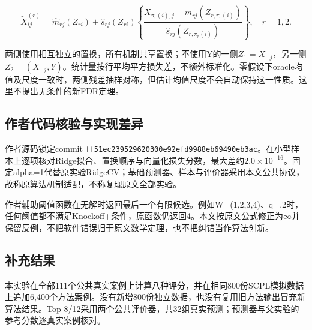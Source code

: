 \documentclass[UTF8,11pt,a4paper]{ctexart}
\begin{document}
\[
\widetilde X^{(r)}_{ij}
=\widehat m_{rj}(Z_{ri})+
\widehat s_{rj}(Z_{ri})
\left\{\frac{X_{\pi_r(i),j}-\widehat m_{rj}(Z_{r,\pi_r(i)})}
{\widehat s_{rj}(Z_{r,\pi_r(i)})}\right\},\quad r=1,2.
\]

两侧使用相互独立的置换，所有机制共享置换；不使用Y的一侧\(Z_1=X_{-j}\)，另一侧\(Z_2=(X_{-j},Y)\)。统计量按行平均平方损失差，不额外标准化。零假设下oracle均值及尺度一致时，两侧残差抽样对称，但估计均值尺度不会自动保持这一性质。这里不提出无条件的新FDR定理。

\subsection{作者代码核验与实现差异}

作者源码锁定commit \texttt{ff51ec239529620300e92efd9988eb69490eb3ac}。在小型样本上逐项核对Ridge拟合、置换顺序与向量化损失分数，最大差约\(2.0\times10^{-16}\)。固定alpha=1代替原实验RidgeCV；基础预测器、样本与评价器采用本文公共协议，故称原算法机制适配，不称复现原文全部实验。

作者辅助阈值函数在无解时返回最后一个有限候选。例如W=(1,2,3,4)、q=.2时，任何阈值都不满足Knockoff+条件，原函数仍返回4。本文按原文公式修正为\(\infty\)并保留反例，不把软件错误归于原文数学定理，也不把纠错当作算法创新。

\subsection{补充结果}

本实验在全部111个公共真实案例上计算八种评分，并在相同800份SCPL模拟数据上追加6,400个方法案例。没有新增800份独立数据，也没有复用旧方法输出冒充新算法结果。Top-8/12采用两个公共评价器，共32组真实预测；预测器与父实验的参考分数逐真实案例核对。
\end{document}
